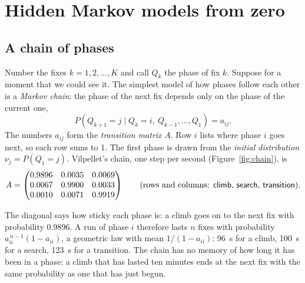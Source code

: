 \section{Hidden Markov models from zero}\label{sec:hmm}

\subsection{A chain of phases}\label{sec:chain}

Number the fixes $k=1,2,\dots,K$ and call $Q_k$ the phase of fix $k$. Suppose for a moment that we
could see it. The simplest model of how phases follow each other is a \emph{Markov chain}: the
phase of the next fix depends only on the phase of the current one,
\begin{equation}\label{eq:markov}
  P(Q_{k+1}=j \mid Q_k=i,\ Q_{k-1},\dots,Q_1) = a_{ij}.
\end{equation}
The numbers $a_{ij}$ form the \emph{transition matrix} $A$. Row $i$ lists where phase $i$ goes
next, so each row sums to 1. The first phase is drawn from the \emph{initial distribution}
$\nu_j=P(Q_1=j)$. Vilpellet's chain, one step per second (Figure~\ref{fig:chain}), is
\begin{equation}\label{eq:A}
  A=\begin{pmatrix} 0.9896 & 0.0035 & 0.0069\\ 0.0067 & 0.9900 & 0.0033\\ 0.0010 & 0.0071 & 0.9919 \end{pmatrix}
  \qquad\text{(rows and columns: \textsf{climb}, \textsf{search}, \textsf{transition}).}
\end{equation}

The diagonal says how sticky each phase is: a climb goes on to the next fix with probability
0.9896. A run of phase $i$ therefore lasts $n$ fixes with probability $a_{ii}^{\,n-1}(1-a_{ii})$, a
geometric law with mean $1/(1-a_{ii})$: 96~s for a climb, 100~s for a search, 123~s for a
transition. The chain has no memory of how long it has been in a phase: a climb that has lasted
ten minutes ends at the next fix with the same probability as one that has just begun.

